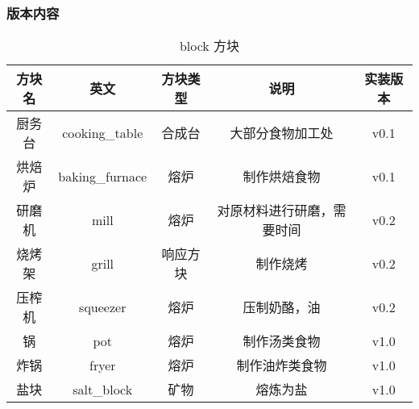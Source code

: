 \subsubsection{版本内容}

\begin{table}[H]
    \centering
    \caption{block 方块}
    \setlength{\tabcolsep}{4mm}
    \begin{tabular}{c|cc|cc}
        \toprule
        \textbf{方块名} & 英文           & \textbf{方块类型} & \textbf{说明}              & \textbf{实装版本} \\
        \midrule
        厨务台          & cooking\_table & 合成台            & 大部分食物加工处           & v0.1              \\
        烘焙炉          & baking\_furnace   & 熔炉              & 制作烘焙食物               & v0.1              \\
        研磨机          & mill       & 熔炉            & 对原材料进行研磨，需要时间 & v0.2              \\
        烧烤架          & grill          & 响应方块      & 制作烧烤                   & v0.2              \\
        压榨机          & squeezer       & 熔炉              & 压制奶酪，油               & v0.2              \\
        锅              & pot            & 熔炉              & 制作汤类食物               & v1.0              \\
        炸锅            & fryer          & 熔炉              & 制作油炸类食物             & v1.0              \\
        \midrule
        盐块            & salt\_block     & 矿物             & 熔炼为盐                   & v1.0              \\
        \bottomrule
    \end{tabular}
\end{table}

